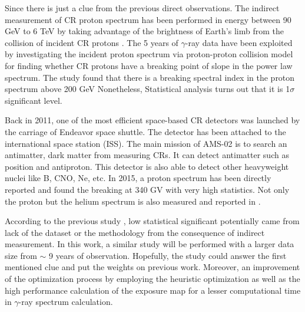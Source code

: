 Since there is just a clue from the previous direct observations.
The indirect measurement of CR proton spectrum has been performed in
energy between 90 GeV to 6 TeV by taking advantage of the brightness of
Earth's limb from the collision of incident CR protons \citep{FermiEarth14}.
The 5 years of $\gamma$-ray data have been exploited by investigating the incident proton spectrum via proton-proton collision model for finding whether CR protons have a breaking point of slope in the power 
law spectrum. The study found that there is a breaking spectral index
in the proton spectrum above 200 GeV 
Nonetheless, Statistical analysis turns out that it is 1$\sigma$
significant level.


Back in 2011, one of the most efficient
space-based CR detectors was launched by the carriage of Endeavor
space shuttle. The detector has been attached to the international space station (ISS). The main mission of AMS-02 is to search an 
antimatter, dark matter from measuring CRs. It can
detect antimatter such as position and antiproton. This detector
is also able to detect other heavyweight nuclei like B, CNO,
Ne, etc. In 2015, a proton spectrum has been directly
reported and found the breaking at 340 GV \citep{AMS02pr2015}
with very high statistics. Not only the proton but the helium spectrum
is also measured and reported in \cite{Heliumflux2015}. 



According to the previous study \citep{FermiEarth14}, 
low statistical significant potentially came from lack of the 
dataset or the methodology from the consequence of indirect
measurement. In this work, a similar study will be performed with 
a larger data size from $\sim$ 9 years of observation. Hopefully, 
the study could answer the first mentioned clue and put the weights
on previous work. Moreover, an improvement of the optimization
process by employing the heuristic optimization as well as the
high performance calculation of the exposure map for a lesser
computational time in $\gamma$-ray spectrum calculation. 